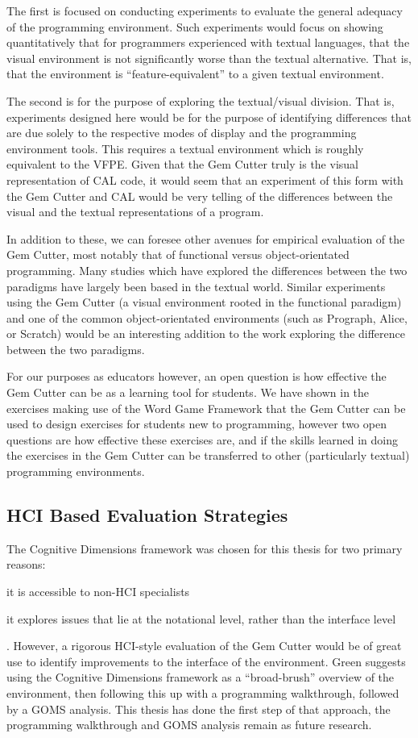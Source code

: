 The first is focused on conducting experiments to evaluate the general adequacy of the programming environment.  Such experiments would focus on showing quantitatively that for programmers experienced with textual languages, that the visual environment is not significantly worse than the textual alternative.  That is, that the environment is ``feature-equivalent'' to a given textual environment.

The second is for the purpose of exploring the textual/visual division.  That is, experiments designed here would be for the purpose of identifying differences that are due solely to the respective modes of display and the programming environment tools.  This requires a textual environment which is roughly equivalent to the VFPE.  Given that the Gem Cutter truly is the visual representation of CAL code, it would seem that an experiment of this form with the Gem Cutter and CAL would be very telling of the differences between the visual and the textual representations of a program.

In addition to these, we can foresee other avenues for empirical evaluation of the Gem Cutter, most notably that of functional versus object-orientated programming.  Many studies which have explored the differences between the two paradigms have largely been based in the textual world.  Similar experiments using the Gem Cutter (a visual environment rooted in the functional paradigm) and one of the common object-orientated environments (such as Prograph, Alice, or Scratch) would be an interesting addition to the work exploring the difference between the two paradigms.

For our purposes as educators however, an open question is how effective the Gem Cutter can be as a learning tool for students.  We have shown in the exercises making use of the Word Game Framework that the Gem Cutter can be used to design exercises for students new to programming, however two open questions are how effective these exercises are, and if the skills learned in doing the exercises in the Gem Cutter can be transferred to other (particularly textual) programming environments.

\subsection{HCI Based Evaluation Strategies}

The Cognitive Dimensions framework was chosen for this thesis for two primary reasons: 
\begin{inparaenum}[(i)]
	\item it is accessible to non-HCI specialists
	\item it explores issues that lie at the notational level, rather than the interface level
\end{inparaenum}.  However, a rigorous HCI-style evaluation of the Gem Cutter would be of great use to identify improvements to the interface of the environment.  Green suggests using the Cognitive Dimensions framework as a ``broad-brush'' overview of the environment, then following this up with a programming walkthrough, followed by a GOMS analysis.  This thesis has done the first step of that approach, the programming walkthrough and GOMS analysis remain as future research.

